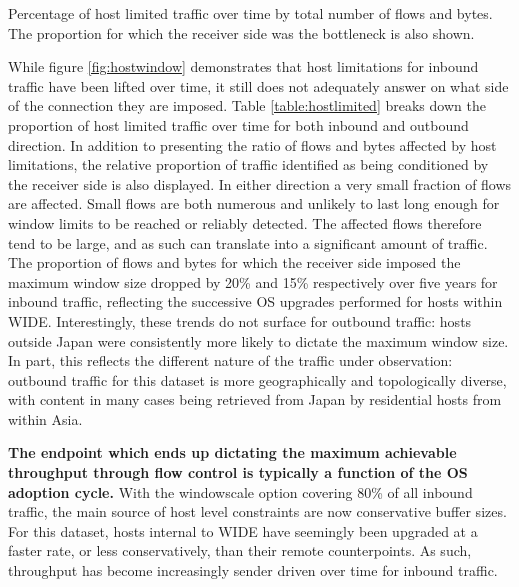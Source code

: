 \begin{table}\footnotesize
\centering
  \caption{\label{table:hostlimited}Percentage of host limited traffic over time by total number of flows and bytes. The proportion for which the receiver side was the bottleneck is also shown.}
\end{table}

While figure \ref{fig:hostwindow} demonstrates that host limitations for inbound traffic have been lifted over time, it still does not adequately answer on what side of the connection they are imposed.
Table \ref{table:hostlimited} breaks down the proportion of host limited traffic over time for both inbound and outbound direction.
In addition to presenting the ratio of flows and bytes affected by host limitations, the relative proportion of traffic identified as being conditioned by the receiver side is also displayed.
In either direction a very small fraction of flows are affected.
Small flows are both numerous and unlikely to last long enough for window limits to be reached or reliably detected.
The affected flows therefore tend to be large, and as such can translate into a significant amount of traffic.
The proportion of flows and bytes for which the receiver side imposed the maximum window size dropped by 20\% and 15\% respectively over five years for inbound traffic, reflecting the successive \ac{OS} upgrades performed for hosts within \ac{WIDE}.
Interestingly, these trends do not surface for outbound traffic: hosts outside Japan were consistently more likely to dictate the maximum window size.
In part, this reflects the different nature of the traffic under observation: outbound traffic for this dataset is more geographically and topologically diverse, with content in many cases being retrieved from Japan by residential hosts from within Asia.

\textbf{The endpoint which ends up dictating the maximum achievable throughput through flow control is typically a function of the \ac{OS} adoption cycle.}
With the windowscale option covering 80\% of all inbound traffic, the main source of host level constraints are now conservative buffer sizes.
For this dataset, hosts internal to \ac{WIDE} have seemingly been upgraded at a faster rate, or less conservatively, than their remote counterpoints.
As such, throughput has become increasingly sender driven over time for inbound traffic.

